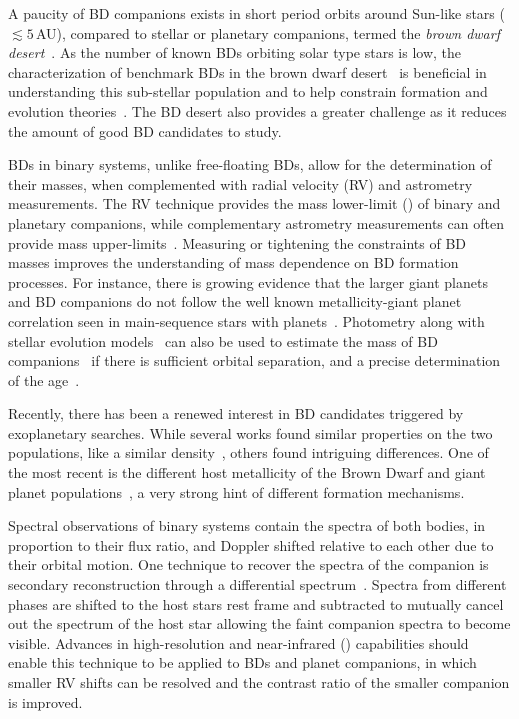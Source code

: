 A paucity of BD companions exists in short period orbits around Sun-like stars (\(\lesssim5 \)\,AU), compared to stellar or planetary companions, termed the \emph{brown dwarf desert}~\citep{halbwachs_exploring_2000,zucker_analysis_2001,sahlmann_search_2011}. As the number of known BDs orbiting solar type stars is low, the characterization of benchmark BDs in the brown dwarf desert~\citep[e.g.][]{crepp_trends_2016} is beneficial in understanding this sub-stellar population and to help constrain formation and evolution theories~\citep{whitworth_formation_2007}. The BD desert also provides a greater challenge as it reduces the amount of good BD candidates to study.

BDs in binary systems, unlike free-floating BDs, allow for the determination of their masses, when complemented with radial velocity ({RV}) and astrometry measurements. The {RV} technique provides the mass lower-limit (\mtwosini{}) of binary and planetary companions, while complementary astrometry measurements can often provide mass upper-limits~\citep[e.g.][]{sahlmann_search_2011}. Measuring or tightening the constraints of BD masses improves the understanding of mass dependence on BD formation processes. For instance, there is growing evidence that the larger giant planets and BD companions do not follow the well known metallicity-giant planet correlation seen in main-sequence stars with planets~\citep[e.g.][]{santos_spectroscopic_2004,santos_observational_2017, maldonado_searching_2017}. Photometry along with stellar evolution models~\citep[e.g.][]{baraffe_evolutionary_2003,allard_btsettl_2013} can also be used to estimate the mass of BD companions~\citep[e.g.][]{moutou_eccentricity_2017} if there is sufficient orbital separation, and a precise determination of the age~\citep{soderblom_ages_2010}.

Recently, there has been a renewed interest in BD candidates triggered by exoplanetary searches. While several works found similar properties on the two populations, like a similar density~\citep{hatzes_definition_2015}, others found intriguing differences. One of the most recent is the different host metallicity of the Brown Dwarf and giant planet populations~\citep{santos_observational_2017, schlaufman_evidence_2018}, a very strong hint of different formation mechanisms.

Spectral observations of binary systems contain the spectra of both bodies, in proportion to their flux ratio, and Doppler shifted relative to each other due to their orbital motion. One technique to recover the spectra of the companion is secondary reconstruction through a differential spectrum~\citep{ferluga_separating_1997}. Spectra from different phases are shifted to the host stars rest frame and subtracted to mutually cancel out the spectrum of the host star allowing the faint companion spectra to become visible. Advances in high-resolution and near-infrared (\nir{}) capabilities should enable this technique to be applied to BDs and planet companions, in which smaller {RV} shifts can be resolved and the contrast ratio of the smaller companion is improved.

